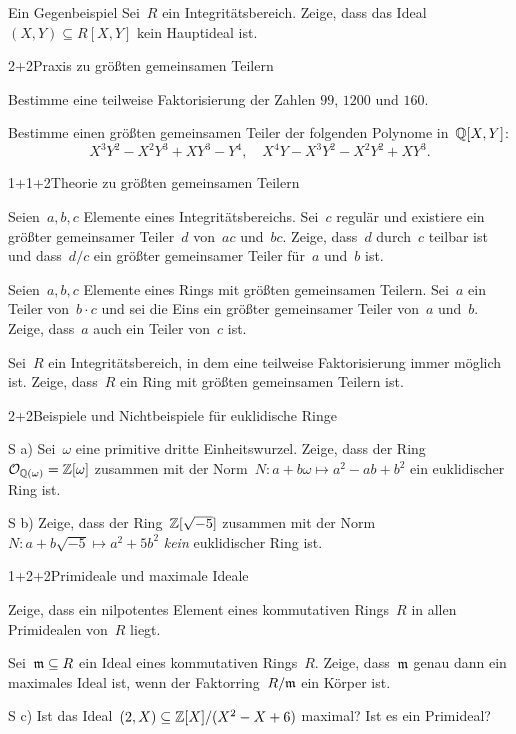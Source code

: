 \documentclass{algblatt}
\begin{document}

\begin{aufgabe}{3}{Ein Gegenbeispiel}
Sei~$R$ ein Integritätsbereich. Zeige, dass das Ideal~$(X,Y) \subseteq R[X,Y]$
kein Hauptideal ist.
\end{aufgabe}

\begin{aufgabeE}{2+2}{Praxis zu größten gemeinsamen Teilern}
\item Bestimme eine teilweise Faktorisierung der Zahlen $99$, $1200$ und $160$.
\item Bestimme einen größten gemeinsamen Teiler der folgenden Polynome
in~$\mathbb{Q}[X,Y]$:
\[ X^3Y^2 - X^2Y^3 + XY^3 - Y^4, \quad X^4Y - X^3Y^2 - X^2Y^2 + XY^3. \]
\end{aufgabeE}
\vspace{-1em}

\begin{aufgabeE}{1+1+2}{Theorie zu größten gemeinsamen Teilern}
\item Seien~$a,b,c$ Elemente eines Integritätsbereichs. Sei~$c$ regulär und
existiere ein größter gemeinsamer Teiler~$d$ von~$ac$ und~$bc$. Zeige, dass~$d$
durch~$c$ teilbar ist und dass~$d/c$ ein größter gemeinsamer Teiler für~$a$
und~$b$ ist.
\item Seien~$a,b,c$ Elemente eines Rings mit größten gemeinsamen Teilern.
Sei~$a$ ein Teiler von~$b \cdot c$ und sei die Eins ein größter gemeinsamer
Teiler von~$a$ und~$b$. Zeige, dass~$a$ auch ein Teiler von~$c$ ist.
\item Sei~$R$ ein Integritätsbereich, in dem eine teilweise Faktorisierung
immer möglich ist. Zeige, dass~$R$ ein Ring mit größten gemeinsamen Teilern
ist.
\end{aufgabeE}

\begin{aufgabeE}{2+2}{Beispiele und Nichtbeispiele für euklidische Ringe}
\item[S a)] Sei~$\omega$ eine primitive dritte Einheitswurzel. Zeige, dass der
Ring~$\mathcal{O}_{\mathbb{Q}(\omega)} = \mathbb{Z}[\omega]$ zusammen mit der Norm~$N : a+b\omega
\mapsto a^2 - ab + b^2$ ein euklidischer Ring ist.
\item[S b)] Zeige, dass der Ring~$\mathbb{Z}[\sqrt{-5}]$ zusammen mit der Norm~$N :
a+b\sqrt{-5} \mapsto a^2 + 5b^2$ \emph{kein} euklidischer Ring ist.
\end{aufgabeE}

\begin{aufgabeE}{1+2+2}{Primideale und maximale Ideale}
\item Zeige, dass ein nilpotentes Element eines kommutativen Rings~$R$ in allen
Primidealen von~$R$ liegt.
\item Sei~$\mathfrak{m} \subseteq R$ ein Ideal eines kommutativen Rings~$R$. Zeige,
dass~$\mathfrak{m}$ genau dann ein maximales Ideal ist, wenn der Faktorring~$R/\mathfrak{m}$ ein
Körper ist.
\item[S c)] Ist das Ideal~$(2, X) \subseteq \mathbb{Z}[X]/(X^2-X+6)$ maximal? Ist es ein
Primideal?
\end{aufgabeE}
\end{document}
